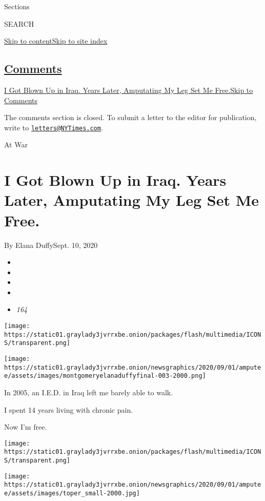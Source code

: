 Sections

SEARCH

\protect\hyperlink{site-content}{Skip to
content}\protect\hyperlink{site-index}{Skip to site index}

\hypertarget{comments}{%
\subsection{\texorpdfstring{\protect\hyperlink{commentsContainer}{Comments}}{Comments}}\label{comments}}

\href{}{I Got Blown Up in Iraq. Years Later, Amputating My Leg Set Me
Free.}\href{}{Skip to Comments}

The comments section is closed. To submit a letter to the editor for
publication, write to
\href{mailto:letters@NYTimes.com}{\nolinkurl{letters@NYTimes.com}}.

At War

\hypertarget{i-got-blown-up-in-iraq-years-later-amputating-my-leg-set-me-free}{%
\section{I Got Blown Up in Iraq. Years Later, Amputating My Leg Set Me
Free.}\label{i-got-blown-up-in-iraq-years-later-amputating-my-leg-set-me-free}}

By Elana DuffySept. 10, 2020

\begin{itemize}
\item
\item
\item
\item
\item
  \emph{164}
\end{itemize}

\texttt{[image: https://static01.graylady3jvrrxbe.onion/packages/flash/multimedia/ICONS/transparent.png]}

\texttt{[image: https://static01.graylady3jvrrxbe.onion/newsgraphics/2020/09/01/amputee/assets/images/montgomeryelanaduffyfinal-003-2000.png]}

In 2005, an I.E.D. in Iraq left me barely able to walk.

I spent 14 years living with chronic pain.

Now I'm free.

\texttt{[image: https://static01.graylady3jvrrxbe.onion/packages/flash/multimedia/ICONS/transparent.png]}

\texttt{[image: https://static01.graylady3jvrrxbe.onion/newsgraphics/2020/09/01/amputee/assets/images/toper\_small-2000.jpg]}

